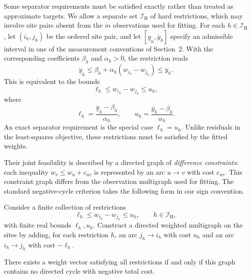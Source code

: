 Some separator requirements must be satisfied exactly rather than treated as approximate targets. We allow a separate set $\mathcal I_{\mathrm H}$ of hard restrictions, which may involve site pairs absent from the $m$ observations used for fitting. For each $h\in\mathcal I_{\mathrm H}$, let $(i_h,j_h)$ be the ordered site pair, and let $[\underline y_h,\overline y_h]$ specify an admissible interval in one of the measurement conventions of Section~2. With the corresponding coefficients $\beta_h$ and $\alpha_h>0$, the restriction reads
\begin{equation}
\underline y_h\le
\beta_h+\alpha_h(w_{i_h}-w_{j_h})
\le\overline y_h.
\label{eq:hard-measurement-interval}
\end{equation}
This is equivalent to the bounds
\begin{equation}
\boxed{\ell_h\le w_{i_h}-w_{j_h}\le u_h,}
\label{eq:hard-weight-interval}
\end{equation}
where
\begin{equation}
\ell_h=\frac{\underline y_h-\beta_h}{\alpha_h},
\qquad
u_h=\frac{\overline y_h-\beta_h}{\alpha_h}.
\end{equation}
An exact separator requirement is the special case $\ell_h=u_h$. Unlike residuals in the least-squares objective, these restrictions must be satisfied by the fitted weights.

Their joint feasibility is described by a directed graph of \emph{difference constraints}: each inequality $w_v\le w_u+c_{uv}$ is represented by an arc $u\to v$ with cost $c_{uv}$. This constraint graph differs from the observation multigraph used for fitting. The standard negative-cycle criterion \citep[Sec.~24.4]{Cormen2009} takes the following form in our sign convention.

\begin{proposition}
\label{prop:hard-feasibility}
Consider a finite collection of restrictions
\begin{equation}
\ell_h\le w_{i_h}-w_{j_h}\le u_h,
\qquad h\in\mathcal I_{\mathrm H},
\end{equation}
with finite real bounds $\ell_h,u_h$. Construct a directed weighted multigraph on the sites by adding, for each restriction $h$, an arc $j_h\to i_h$ with cost $u_h$ and an arc $i_h\to j_h$ with cost $-\ell_h$.

There exists a weight vector satisfying all restrictions if and only if this graph contains no directed cycle with negative total cost.
\end{proposition}

